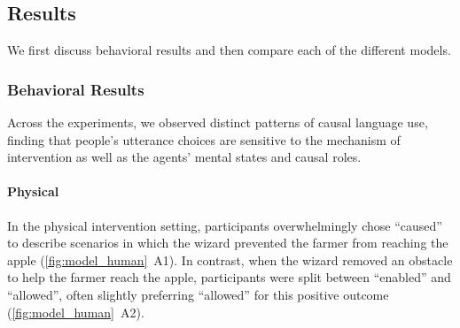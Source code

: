 \documentclass[10pt,letterpaper]{article}
\begin{document}






\subsection{Results}

We first discuss behavioral results and then compare each of the different models. 



\subsubsection{Behavioral Results}
Across the experiments, we observed distinct patterns of causal language use, finding that people's utterance choices are sensitive to the mechanism of intervention as well as the agents' mental states and causal roles.

\paragraph{Physical}
In the physical intervention setting, participants overwhelmingly chose ``caused'' to describe scenarios in which the wizard prevented the farmer from reaching the apple (\autoref{fig:model_human}~A1). 
In contrast, when the wizard removed an obstacle to help the farmer reach the apple, participants were split between ``enabled'' and ``allowed'', often slightly preferring ``allowed'' for this positive outcome (\autoref{fig:model_human}~A2). 
\end{document}
